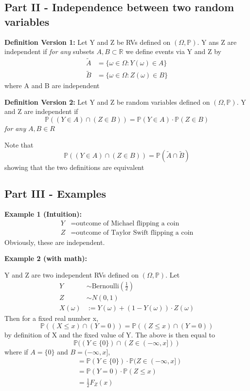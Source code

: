 \documentclass[12pt]{article}
\renewcommand{\P}{\mathbb{P}}
\newcommand{\R}{\mathbb{R}}
\begin{document}
\subsection*{Part II - Independence between two random variables}
\textbf{Definition Version 1:} Let Y and Z be RVs defined on $(\Omega, \P)$. Y ans Z are independent if \emph{for any} subsets $A, B \subset \R$ we define events via Y and Z by 
\begin{align*}
    \tilde{A} &= \{\omega \in \Omega : Y(\omega) \in A\}\\
    \tilde{B} &= \{\omega \in \Omega : Z(\omega) \in B\}
\end{align*}
where A and B are independent  

\textbf{Definition Version 2:} Let Y and Z be random variables defined on $(\Omega, \P)$. Y and Z are independent if 
\[\P((Y \in A) \cap (Z \in B)) = \P(Y \in A) \cdot \P(Z \in B)\]
\emph{for any} $A, B \in R$

Note that 
\[\P((Y \in A) \cap (Z \in B)) = \P(\tilde{A} \cap \tilde{B})\] 
showing that the two definitions are equivalent

\subsection*{Part III - Examples}
\textbf{Example 1 (Intuition):}
\begin{align*}
    Y &= \text{outcome of Michael flipping a coin}\\
    Z &= \text{outcome of Taylor Swift flipping a coin}
\end{align*}
Obviously, these are independent.

\textbf{Example 2 (with math):}

Y and Z are two independent RVs defined on $(\Omega, \P)$. Let 
\begin{align*}
    Y &\sim \text{Bernoulli}(\frac{1}{2})\\
    Z &\sim N(0, 1)\\
    X(\omega) &:= Y(\omega) + (1 - Y(\omega))\cdot Z(\omega)
\end{align*}
Then for a fixed real number x, 
\[\P((X \leq x) \cap (Y = 0)) = \P((Z \leq x) \cap (Y = 0))\]
by definition of X and the fixed value of Y.
The above is then equal to 
\[\P((Y \in \{0\})\cap (Z \in (-\infty, x]))\]
where if $A = \{0\}$ and $B = (-\infty, x]$, 
\begin{align*}
    &= \P(Y \in \{0\}) \cdot \P(Z \in (-\infty, x])\\
    &= \P(Y = 0) \cdot \P(Z \leq x)\\
    &=\frac{1}{2}F_Z(x)
\end{align*}
\end{document}

